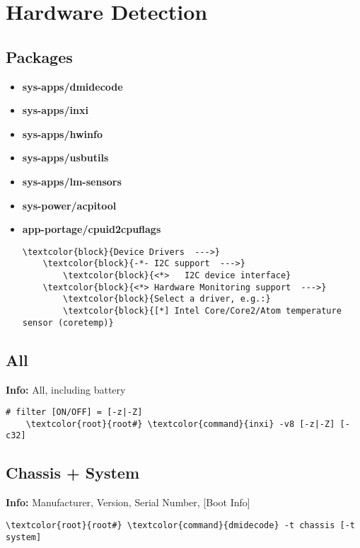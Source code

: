 \documentclass[10pt, a4paper, onecolumn, openany]{book}         %
\begin{document}
\chapter{Hardware Detection}%
\label{hw-detection}
\section{Packages}
\begin{itemize}
    \item \textbf{sys-apps/dmidecode}
    \item \textbf{sys-apps/inxi}
    \item \textbf{sys-apps/hwinfo}
    \item \textbf{sys-apps/usbutils}
    \item \textbf{sys-apps/lm-sensors}
    \item \textbf{sys-power/acpitool}
    \item \textbf{app-portage/cpuid2cpuflags}
\begin{Verbatim}[commandchars=\\\{\}]
\textcolor{block}{Device Drivers  --->}
    \textcolor{block}{-*- I2C support  --->}
        \textcolor{block}{<*>   I2C device interface}
    \textcolor{block}{<*> Hardware Monitoring support  --->}
        \textcolor{block}{Select a driver, e.g.:}
        \textcolor{block}{[*] Intel Core/Core2/Atom temperature sensor (coretemp)}
\end{Verbatim}
\end{itemize}
\section{All}
\textbf{Info:} All, including battery
\begin{Verbatim}[commandchars=\\\{\}]
# filter [ON/OFF] = [-z|-Z]
    \textcolor{root}{root#} \textcolor{command}{inxi} -v8 [-z|-Z] [-c32]
\end{Verbatim}

\section{Chassis + System}
\textbf{Info:} Manufacturer, Version, Serial Number, [Boot Info]
\begin{Verbatim}[commandchars=\\\{\}]
    \textcolor{root}{root#} \textcolor{command}{dmidecode} -t chassis [-t system]
\end{Verbatim}
\end{document}
